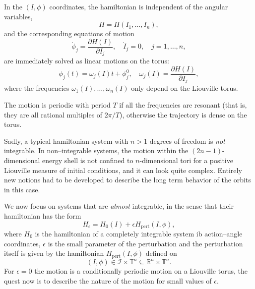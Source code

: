 \documentclass[english,fontsize=11pt,paper=b5]{scrbook}
\numberwithin{equation}{chapter}
\theoremstyle{definition}
\begin{document}
      In the $(I,\phi)$ coordinates, the hamiltonian is independent of the angular variables,
      \begin{equation}
        H = H(I_1, \ldots, I_n),
      \end{equation}
      and the corresponding equations of motion
      \begin{equation}
        \dot \phi_j = \frac{\partial H(I)}{\partial I_j}, \quad
        \dot I_j = 0, \quad
        j=1,\ldots,n,
      \end{equation}
      are immediately solved as linear motions on the torus:
      \begin{equation}
        \phi_j(t) = \omega_j(I) t + \phi_j^0, \quad \omega_j(I) = \frac{\partial H(I)}{\partial I_j},
      \end{equation}
      where the frequencies $\omega_1(I), \ldots, \omega_n(I)$ only depend on the Liouville torus.

      The motion is periodic with period $T$ if all the frequencies are resonant (that is, they are all rational multiples of $2\pi/T$), otherwise the trajectory is dense on the torus.

      Sadly, a typical hamiltonian system with $n>1$ degrees of freedom is \emph{not} integrable.
      In  non--integrable systems, the motion within the $(2n-1)$-dimensional energy shell is not confined to $n$-dimensional tori for a positive Liouville measure of initial conditions, and it can look quite complex.
      Entirely new notions had to be developed to describe the long term behavior of the orbits in this case.

      We now focus on systems that are \emph{almost} integrable, in the sense that their hamiltonian has the form
      \begin{equation}
        H_\epsilon = H_0(I) + \epsilon H_{\mathrm{pert}}(I,\phi),
      \end{equation}
      where $H_0$ is the hamiltonian of a completely integrable system ib action--angle coordinates, $\epsilon$ is the small parameter of the perturbation and the perturbation itself is given by the hamiltonian $H_{\mathrm{pert}}(I,\phi)$ defined on
      \begin{equation}
        (I,\phi) \in \mathcal{I} \times \mathbb{T}^n \subseteq \mathbb{R}^n\times\mathbb{T}^n.
      \end{equation}
      For $\epsilon=0$ the motion is a conditionally periodic motion on a Liouville torus, the quest now is to describe the nature of the motion for small values of $\epsilon$.
\end{document}
